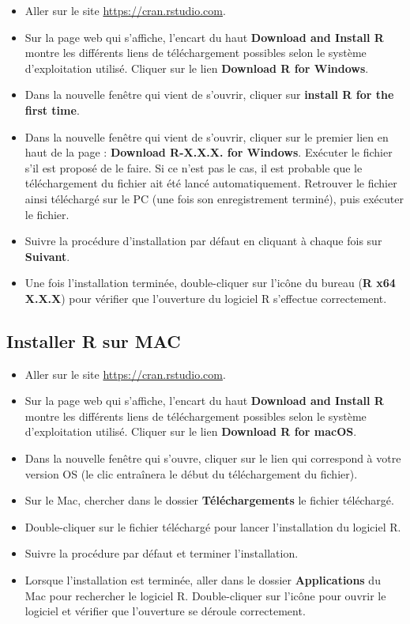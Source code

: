 \documentclass[
]{book}
\providecommand{\tightlist}{%
  \setlength{\itemsep}{0pt}\setlength{\parskip}{0pt}}
\begin{document}
\begin{itemize}
\tightlist
\item
  Aller sur le site \url{https://cran.rstudio.com}.
\item
  Sur la page web qui s'affiche, l'encart du haut \textbf{Download and Install R} montre les différents liens de téléchargement possibles selon le système d'exploitation utilisé. Cliquer sur le lien \textbf{Download R for Windows}.
\item
  Dans la nouvelle fenêtre qui vient de s'ouvrir, cliquer sur \textbf{install R for the first time}.
\item
  Dans la nouvelle fenêtre qui vient de s'ouvrir, cliquer sur le premier lien en haut de la page : \textbf{Download R-X.X.X. for Windows}. Exécuter le fichier s'il est proposé de le faire. Si ce n'est pas le cas, il est probable que le téléchargement du fichier ait été lancé automatiquement. Retrouver le fichier ainsi téléchargé sur le PC (une fois son enregistrement terminé), puis exécuter le fichier.
\item
  Suivre la procédure d'installation par défaut en cliquant à chaque fois sur \textbf{Suivant}.
\item
  Une fois l'installation terminée, double-cliquer sur l'icône du bureau (\textbf{R x64 X.X.X}) pour vérifier que l'ouverture du logiciel R s'effectue correctement.
\end{itemize}

\hypertarget{installer-r-sur-mac}{%
\subsection{Installer R sur MAC}\label{installer-r-sur-mac}}

\begin{itemize}
\tightlist
\item
  Aller sur le site \url{https://cran.rstudio.com}.
\item
  Sur la page web qui s'affiche, l'encart du haut \textbf{Download and Install R} montre les différents liens de téléchargement possibles selon le système d'exploitation utilisé. Cliquer sur le lien \textbf{Download R for macOS}.
\item
  Dans la nouvelle fenêtre qui s'ouvre, cliquer sur le lien qui correspond à votre version OS (le clic entraînera le début du téléchargement du fichier).
\item
  Sur le Mac, chercher dans le dossier \textbf{Téléchargements} le fichier téléchargé.
\item
  Double-cliquer sur le fichier téléchargé pour lancer l'installation du logiciel R.
\item
  Suivre la procédure par défaut et terminer l'installation.
\item
  Lorsque l'installation est terminée, aller dans le dossier \textbf{Applications} du Mac pour rechercher le logiciel R. Double-cliquer sur l'icône pour ouvrir le logiciel et vérifier que l'ouverture se déroule correctement.
\end{itemize}
\end{document}
